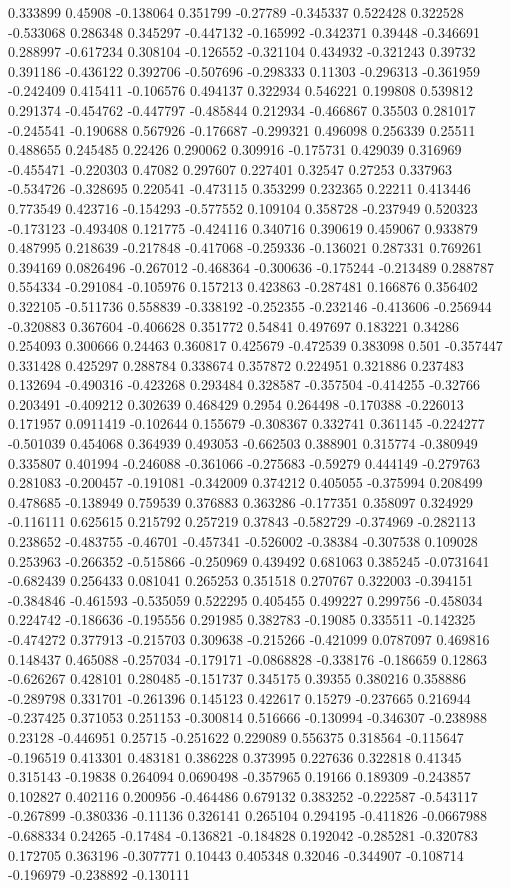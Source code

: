 0.333899 0.45908 -0.138064 0.351799 -0.27789 -0.345337 0.522428 0.322528 -0.533068 0.286348 0.345297 -0.447132 -0.165992 -0.342371 0.39448 -0.346691 0.288997 -0.617234 0.308104 -0.126552 -0.321104 0.434932 -0.321243 0.39732 0.391186 -0.436122 0.392706 -0.507696 -0.298333 0.11303 -0.296313 -0.361959 -0.242409 0.415411 -0.106576 0.494137 0.322934 0.546221 0.199808 0.539812 0.291374 -0.454762 -0.447797 -0.485844 0.212934 -0.466867 0.35503 0.281017 -0.245541 -0.190688 0.567926 -0.176687 -0.299321 0.496098 0.256339 0.25511 0.488655 0.245485 0.22426 0.290062 0.309916 -0.175731 0.429039 0.316969 -0.455471 -0.220303 0.47082 0.297607 0.227401 0.32547 0.27253 0.337963 -0.534726 -0.328695 0.220541 -0.473115 0.353299 0.232365 0.22211 0.413446 0.773549 0.423716 -0.154293 -0.577552 0.109104 0.358728 -0.237949 0.520323 -0.173123 -0.493408 0.121775 -0.424116 0.340716 0.390619 0.459067 0.933879 0.487995 0.218639 -0.217848 -0.417068 -0.259336 -0.136021 0.287331 0.769261 0.394169 0.0826496 -0.267012 -0.468364 -0.300636 -0.175244 -0.213489 0.288787 0.554334 -0.291084 -0.105976 0.157213 0.423863 -0.287481 0.166876 0.356402 0.322105 -0.511736 0.558839 -0.338192 -0.252355 -0.232146 -0.413606 -0.256944 -0.320883 0.367604 -0.406628 0.351772 0.54841 0.497697 0.183221 0.34286 0.254093 0.300666 0.24463 0.360817 0.425679 -0.472539 0.383098 0.501 -0.357447 0.331428 0.425297 0.288784 0.338674 0.357872 0.224951 0.321886 0.237483 0.132694 -0.490316 -0.423268 0.293484 0.328587 -0.357504 -0.414255 -0.32766 0.203491 -0.409212 0.302639 0.468429 0.2954 0.264498 -0.170388 -0.226013 0.171957 0.0911419 -0.102644 0.155679 -0.308367 0.332741 0.361145 -0.224277 -0.501039 0.454068 0.364939 0.493053 -0.662503 0.388901 0.315774 -0.380949 0.335807 0.401994 -0.246088 -0.361066 -0.275683 -0.59279 0.444149 -0.279763 0.281083 -0.200457 -0.191081 -0.342009 0.374212 0.405055 -0.375994 0.208499 0.478685 -0.138949 0.759539 0.376883 0.363286 -0.177351 0.358097 0.324929 -0.116111 0.625615 0.215792 0.257219 0.37843 -0.582729 -0.374969 -0.282113 0.238652 -0.483755 -0.46701 -0.457341 -0.526002 -0.38384 -0.307538 0.109028 0.253963 -0.266352 -0.515866 -0.250969 0.439492 0.681063 0.385245 -0.0731641 -0.682439 0.256433 0.081041 0.265253 0.351518 0.270767 0.322003 -0.394151 -0.384846 -0.461593 -0.535059 0.522295 0.405455 0.499227 0.299756 -0.458034 0.224742 -0.186636 -0.195556 0.291985 0.382783 -0.19085 0.335511 -0.142325 -0.474272 0.377913 -0.215703 0.309638 -0.215266 -0.421099 0.0787097 0.469816 0.148437 0.465088 -0.257034 -0.179171 -0.0868828 -0.338176 -0.186659 0.12863 -0.626267 0.428101 0.280485 -0.151737 0.345175 0.39355 0.380216 0.358886 -0.289798 0.331701 -0.261396 0.145123 0.422617 0.15279 -0.237665 0.216944 -0.237425 0.371053 0.251153 -0.300814 0.516666 -0.130994 -0.346307 -0.238988 0.23128 -0.446951 0.25715 -0.251622 0.229089 0.556375 0.318564 -0.115647 -0.196519 0.413301 0.483181 0.386228 0.373995 0.227636 0.322818 0.41345 0.315143 -0.19838 0.264094 0.0690498 -0.357965 0.19166 0.189309 -0.243857 0.102827 0.402116 0.200956 -0.464486 0.679132 0.383252 -0.222587 -0.543117 -0.267899 -0.380336 -0.11136 0.326141 0.265104 0.294195 -0.411826 -0.0667988 -0.688334 0.24265 -0.17484 -0.136821 -0.184828 0.192042 -0.285281 -0.320783 0.172705 0.363196 -0.307771 0.10443 0.405348 0.32046 -0.344907 -0.108714 -0.196979 -0.238892 -0.130111 